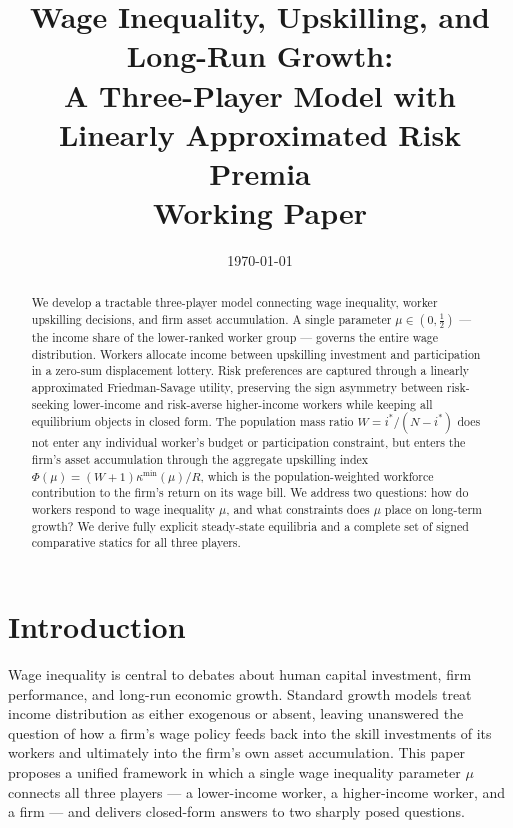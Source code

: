 \documentclass[12pt,a4paper]{article}
\title{\textbf{Wage Inequality, Upskilling, and Long-Run Growth:\\
A Three-Player Model with Linearly Approximated Risk Premia}\\[0.8em]
\large Working Paper}
\author{}
\date{\today}
\begin{document}
\maketitle

\begin{abstract}
We develop a tractable three-player model connecting wage inequality,
worker upskilling decisions, and firm asset accumulation. A single
parameter $\mu \in (0,\tfrac{1}{2})$ --- the income share of the
lower-ranked worker group --- governs the entire wage distribution.
Workers allocate income between upskilling investment and participation
in a zero-sum displacement lottery. Risk preferences are captured through
a linearly approximated Friedman-Savage utility, preserving the sign
asymmetry between risk-seeking lower-income and risk-averse higher-income
workers while keeping all equilibrium objects in closed form. The
population mass ratio $W = i^*/(N-i^*)$ does not enter any individual
worker's budget or participation constraint, but enters the firm's asset
accumulation through the aggregate upskilling index
$\Phi(\mu) = (W+1)\kappa^{\min}(\mu)/R$, which is the population-weighted
workforce contribution to the firm's return on its wage bill. We address
two questions: how do workers respond to wage inequality $\mu$, and what
constraints does $\mu$ place on long-term growth? We derive fully explicit
steady-state equilibria and a complete set of signed comparative statics
for all three players.
\end{abstract}

\tableofcontents
\newpage

\section{Introduction}

Wage inequality is central to debates about human capital investment,
firm performance, and long-run economic growth. Standard growth models
treat income distribution as either exogenous or absent, leaving
unanswered the question of how a firm's wage policy feeds back into
the skill investments of its workers and ultimately into the firm's
own asset accumulation. This paper proposes a unified framework in
which a single wage inequality parameter $\mu$ connects all three
players --- a lower-income worker, a higher-income worker, and a firm
--- and delivers closed-form answers to two sharply posed questions.
\end{document}
